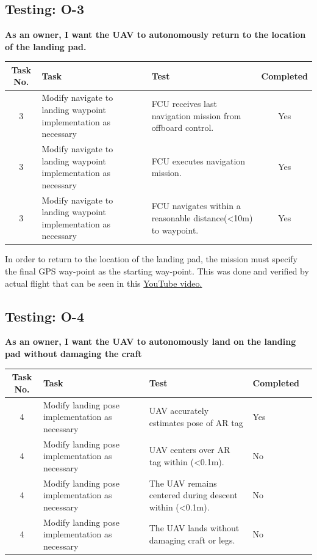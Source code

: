 \newpage
\subsection{Testing: O-3}
\textbf{As an owner, I want the UAV to autonomously return to the location of the landing pad.}\\
\begin{tabular}{| c | >{\raggedright}m{4cm} | m{4cm} | c |}\hline
	Task No. & Task & Test & Completed\\\hline
	3 & Modify navigate to landing waypoint implementation as necessary & FCU receives last navigation mission from offboard control. & Yes\\\hline
	3 & Modify navigate to landing waypoint implementation as necessary & FCU executes navigation mission. & Yes\\\hline
	3 & Modify navigate to landing waypoint implementation as necessary & FCU navigates within a reasonable distance(\textless 10m) to waypoint. & Yes\\\hline
\end{tabular}

In order to return to the location of the landing pad, the mission must specify the final GPS way-point as the starting way-point. This was done and verified by actual flight that can be seen in this \href{https://www.youtube.com/watch?v=wye3LynE1CM}{YouTube video.}

\newpage
\subsection{Testing: O-4}
\textbf{As an owner, I want the UAV to autonomously land on the landing pad without damaging the craft}\\
\begin{tabular}{| c | >{\raggedright}m{4cm} | m{4cm} | m{4cm} | m{4cm} |}\hline
	Task No. & Task & Test & Completed\\\hline
	4 & Modify landing pose implementation as necessary & UAV accurately estimates pose of AR tag & Yes\\\hline
	4 & Modify landing pose implementation as necessary & UAV centers over AR tag within (\textless 0.1m). & No\\\hline
	4 & Modify landing pose implementation as necessary & The UAV remains centered during descent within (\textless 0.1m). & No\\\hline
	4 & Modify landing pose implementation as necessary & The UAV lands without damaging craft or legs. & No\\\hline
\end{tabular}


